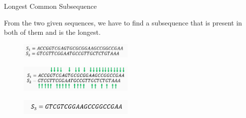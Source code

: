 

\begin{frame}{Longest Common Subsequence}
{
From the two given sequences, we have to find a subsequence that is present in both of them and is the longest.

	\begin{figure}[h]
	\includegraphics[width=0.5\textwidth]{Assets/LCS_1.png}
	\label{fig:1}
\end{figure}

}
{
\begin{figure}[h]
	\includegraphics[width=0.5\textwidth]{Assets/LCS_2.png}
	\label{fig:1}
	\end{figure}

\centering
\begin{figure}[h]
	\includegraphics[width=0.5\textwidth]{Assets/LCS_final.png}
	\label{fig:1}
\end{figure}
}
	
\end{frame}
